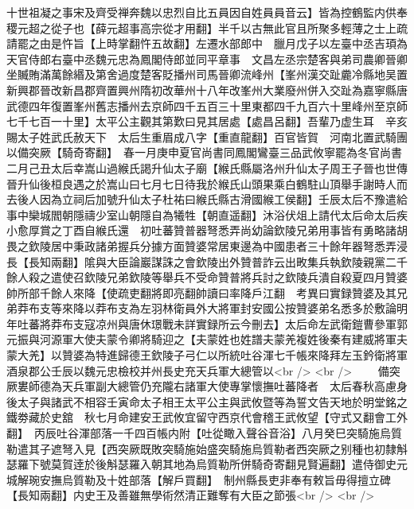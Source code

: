十世祖凝之事宋及齊受禅奔魏以忠烈自比五員因自姓員員音云】皆為控鶴監内供奉稷元超之從子也【薛元超事高宗從才用翻】半千以古無此官且所聚多輕薄之士上疏請罷之由是忤旨【上時掌翻忤五故翻】左遷水部郎中　臘月戊子以左臺中丞吉頊為天官侍郎右臺中丞魏元忠為鳳閣侍郎並同平章事　文昌左丞宗楚客與弟司農卿晉卿坐贓賄滿萬餘緡及第舍過度楚客貶播州司馬晉卿流峰州【峯州漢交趾麊冷縣地吴置新興郡晉改新昌郡齊置興州隋初改華州十八年改峯州大業廢州併入交趾為嘉寧縣唐武德四年復置峯州舊志播州去京師四千五百三十里東都四千九百六十里峰州至京師七千七百一十里】太平公主觀其第歎曰見其居處【處昌呂翻】吾輩乃虚生耳　辛亥賜太子姓武氏赦天下　太后生重眉成八字【重直龍翻】百官皆賀　河南北置武騎團以備突厥【騎奇寄翻】　春一月庚申夏官尚書同鳳閣鸞臺三品武攸寧罷為冬官尚書　二月己丑太后幸嵩山過緱氏謁升仙太子廟【緱氏縣屬洛州升仙太子周王子晉也世傳晉升仙後桓良遇之於嵩山曰七月七日待我於緱氏山頭果乘白鶴駐山頂舉手謝時人而去後人因為立祠后加號升仙太子杜祐曰緱氏縣古滑國緱工侯翻】壬辰太后不豫遣給事中欒城閻朝隱禱少室山朝隱自為犧牲【朝直遥翻】沐浴伏俎上請代太后命太后疾小愈厚賞之丁酉自緱氏還　初吐蕃贊普器弩悉弄尚幼論欽陵兄弟用事皆有勇略諸胡畏之欽陵居中秉政諸弟握兵分據方面贊婆常居東邊為中國患者三十餘年器弩悉弄浸長【長知兩翻】隂與大臣論巖謀誅之會欽陵出外贊普詐云出畋集兵執欽陵親黨二千餘人殺之遣使召欽陵兄弟欽陵等舉兵不受命贊普將兵討之欽陵兵潰自殺夏四月贊婆帥所部千餘人來降【使疏吏翻將即亮翻帥讀曰率降戶江翻　考異曰實録贊婆及其兄弟莽布支等來降以莽布支為左羽林衛員外大將軍封安國公按贊婆弟名悉多於敷論明年吐蕃將莽布支寇凉州與唐休璟戰未詳實録所云今刪去】太后命左武衛鎧曹參軍郭元振與河源軍大使夫蒙令卿將騎迎之【夫蒙姓也姓譜夫蒙羌複姓後秦有建威將軍夫蒙大羌】以贊婆為特進歸德王欽陵子弓仁以所統吐谷渾七千帳來降拜左玉鈐衛將軍酒泉郡公壬辰以魏元忠檢校并州長史充天兵軍大總管以<br />
<br />
　　備突厥婁師德為天兵軍副大總管仍充隴右諸軍大使專掌懷撫吐蕃降者　太后春秋高慮身後太子與諸武不相容壬寅命太子相王太平公主與武攸暨等為誓文告天地於明堂銘之鐵劵藏於史舘　秋七月命建安王武攸宜留守西京代會稽王武攸望【守式又翻會工外翻】　丙辰吐谷渾部落一千四百帳内附【吐從瞰入聲谷音浴】八月癸巳突騎施烏質勒遣其子遮弩入見【西突厥既敗突騎施始盛突騎施烏質勒者西突厥之别種也初隸斛瑟羅下號莫賀逹於後斛瑟羅入朝其地為烏質勒所併騎奇寄翻見賢遍翻】遣侍御史元城解琬安撫烏質勒及十姓部落【解戶買翻】　制州縣長吏非奉有敕旨毋得擅立碑【長知兩翻】内史王及善雖無學術然清正難奪有大臣之節張<br />
<br />
